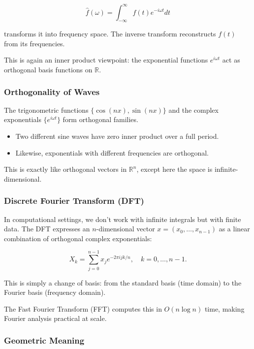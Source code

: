 \documentclass[
  letterpaper,
  DIV=11,
  numbers=noendperiod]{scrreprt}
\providecommand{\tightlist}{%
  \setlength{\itemsep}{0pt}\setlength{\parskip}{0pt}}
\begin{document}
\[
\hat{f}(\omega) = \int_{-\infty}^\infty f(t) e^{-i \omega t} dt
\]

transforms it into frequency space. The inverse transform reconstructs
\(f(t)\) from its frequencies.

This is again an inner product viewpoint: the exponential functions
\(e^{i \omega t}\) act as orthogonal basis functions on \(\mathbb{R}\).

\subsubsection{Orthogonality of Waves}\label{orthogonality-of-waves}

The trigonometric functions \(\{\cos(nx), \sin(nx)\}\) and the complex
exponentials \(\{e^{i\omega t}\}\) form orthogonal families.

\begin{itemize}
\tightlist
\item
  Two different sine waves have zero inner product over a full period.
\item
  Likewise, exponentials with different frequencies are orthogonal.
\end{itemize}

This is exactly like orthogonal vectors in \(\mathbb{R}^n\), except here
the space is infinite-dimensional.

\subsubsection{Discrete Fourier Transform
(DFT)}\label{discrete-fourier-transform-dft}

In computational settings, we don't work with infinite integrals but
with finite data. The DFT expresses an \(n\)-dimensional vector
\(x = (x_0, \dots, x_{n-1})\) as a linear combination of orthogonal
complex exponentials:

\[
X_k = \sum_{j=0}^{n-1} x_j e^{-2\pi i jk / n}, \quad k=0,\dots,n-1.
\]

This is simply a change of basis: from the standard basis (time domain)
to the Fourier basis (frequency domain).

The Fast Fourier Transform (FFT) computes this in \(O(n \log n)\) time,
making Fourier analysis practical at scale.

\subsubsection{Geometric Meaning}\label{geometric-meaning-23}
\end{document}
